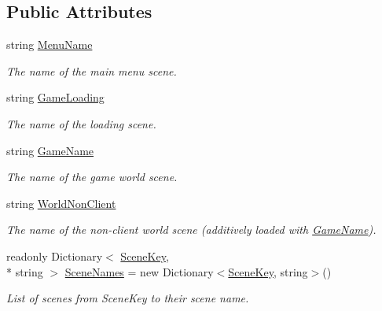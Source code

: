 \subsection*{Public Attributes}
\begin{DoxyCompactItemize}
\item 
string \hyperlink{class_skyrates_1_1_client_1_1_scene_1_1_scene_data_a4dca2dede679e6f2a2d59f76f2a1f1b6}{Menu\-Name}
\begin{DoxyCompactList}\small\item\em The name of the main menu scene. \end{DoxyCompactList}\item 
string \hyperlink{class_skyrates_1_1_client_1_1_scene_1_1_scene_data_a0abaaefcca3b7a51f6ea7c67a9f20b2f}{Game\-Loading}
\begin{DoxyCompactList}\small\item\em The name of the loading scene. \end{DoxyCompactList}\item 
string \hyperlink{class_skyrates_1_1_client_1_1_scene_1_1_scene_data_a48d1b49f072d6c1962ef98e479018d4d}{Game\-Name}
\begin{DoxyCompactList}\small\item\em The name of the game world scene. \end{DoxyCompactList}\item 
string \hyperlink{class_skyrates_1_1_client_1_1_scene_1_1_scene_data_ade8d55070c93f5074a9bf8749d270ef3}{World\-Non\-Client}
\begin{DoxyCompactList}\small\item\em The name of the non-\/client world scene (additively loaded with \hyperlink{class_skyrates_1_1_client_1_1_scene_1_1_scene_data_a48d1b49f072d6c1962ef98e479018d4d}{Game\-Name}). \end{DoxyCompactList}\item 
readonly Dictionary$<$ \hyperlink{class_skyrates_1_1_client_1_1_scene_1_1_scene_data_a31ee71a248fd3456a7e655f71f268583}{Scene\-Key}, \\*
string $>$ \hyperlink{class_skyrates_1_1_client_1_1_scene_1_1_scene_data_a557060e5171ba38f4763c95b5e2b9c3c}{Scene\-Names} = new Dictionary$<$\hyperlink{class_skyrates_1_1_client_1_1_scene_1_1_scene_data_a31ee71a248fd3456a7e655f71f268583}{Scene\-Key}, string$>$()
\begin{DoxyCompactList}\small\item\em List of scenes from Scene\-Key to their scene name. \end{DoxyCompactList}\item 

\end{DoxyCompactItemize}
